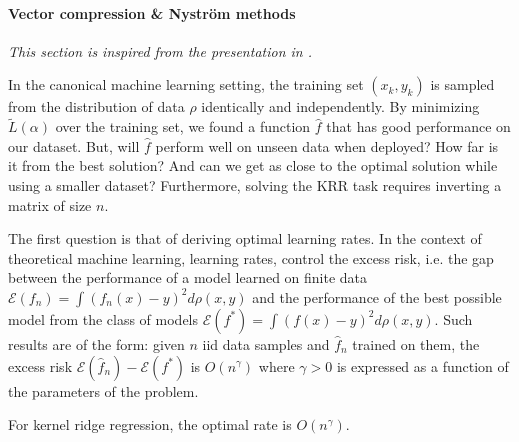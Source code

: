 \paragraph{Vector compression \& Nyström methods}
\emph{This section is inspired from the presentation in \cite{falkon}.}

In the canonical machine learning setting, the training set $(x_k, y_k)$ is sampled from the distribution of data $\rho$ identically and independently. By minimizing $\tilde L(\alpha)$ over the training set, we found a function $\hat f$ that has good performance on our dataset. But, will $\hat f$ perform well on unseen data when deployed? How far is it from the best solution? And can we get as close to the optimal solution while using a smaller dataset? Furthermore, solving the KRR task requires inverting a matrix of size $n$.

The first question is that of deriving optimal learning rates. In the context of theoretical machine learning, learning rates, control the excess risk, i.e. the gap between the performance of a model learned on finite data $\mathcal E(f_n) = \int (f_n(x) - y)^2d\rho(x, y)$ and the performance of the best possible model from the class of models $\mathcal E(f^*) = \int (f(x) - y)^2 d\rho(x, y)$. Such results are of the form: given $n$ iid data samples and $\hat f_n$ trained on them, the excess risk $\mathcal E(\hat f_n) - \mathcal E(f^*)$ is $O(n^{\gamma})$ where $\gamma > 0$ is expressed as a function of the parameters of the problem.

For kernel ridge regression, the optimal rate is $O(n^{\gamma})$\citep{caponetto}.



